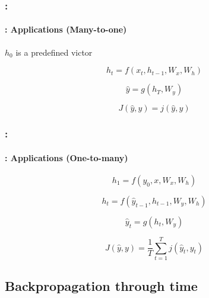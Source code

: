 \documentclass[xcolor=table]{beamer}
\begin{document}
\begin{frame}
	\frametitle{\insertshortsubtitle: \insertsection}
	\framesubtitle{\insertsubsection: Applications (Many-to-one)}
	
	\begin{minipage}{0.4\textwidth}
		\begin{center}
			$h_0$ is a predefined victor
		\end{center}
		
		\[ h_t = f(x_t, h_{t-1}, W_x, W_h)\]
		
		\[ \hat{y} = g(h_T, W_y)\]
		
		\[ J(\hat{y}, y) = j(\hat{y}, y)\]	
	\end{minipage}
	\begin{minipage}{0.58\textwidth}
	\end{minipage}
	
\end{frame}

\begin{frame}
	\frametitle{\insertshortsubtitle: \insertsection}
	\framesubtitle{\insertsubsection: Applications (One-to-many)}
	
	\begin{minipage}{0.4\textwidth}
		
		\[h_1  = f(y_{0}, x, W_x, W_h)\]
		
		\[h_{t} = f(\hat{y}_{t-1}, h_{t-1}, W_y, W_h)\]
		
		\[\hat{y}_{t} = g(h_{t}, W_y)\]
		
		\[ J(\hat{y}, y) = \frac{1}{T} \sum_{t=1}^{T} j(\hat{y}_{t}, y_t)\]
	\end{minipage}
	\begin{minipage}{0.58\textwidth}
	\end{minipage}
	
\end{frame}

\subsection{Backpropagation through time}
\end{document}
